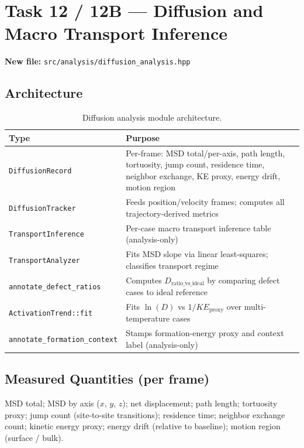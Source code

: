 \documentclass[11pt,a4paper]{article}
\begin{document}
\section{Task 12 / 12B --- Diffusion and Macro Transport Inference}

\textbf{New file:} \texttt{src/analysis/diffusion\_analysis.hpp}

\subsection{Architecture}

\begin{table}[h!]
\centering
\begin{tabularx}{\linewidth}{lX}
\toprule
\textbf{Type} & \textbf{Purpose} \\
\midrule
\texttt{DiffusionRecord}        & Per-frame: MSD total/per-axis, path length, tortuosity, jump count, residence time, neighbor exchange, KE proxy, energy drift, motion region \\
\texttt{DiffusionTracker}       & Feeds position/velocity frames; computes all trajectory-derived metrics \\
\texttt{TransportInference}     & Per-case macro transport inference table (analysis-only) \\
\texttt{TransportAnalyzer}      & Fits MSD slope via linear least-squares; classifies transport regime \\
\texttt{annotate\_defect\_ratios}   & Computes $D_\text{ratio\_vs\_ideal}$ by comparing defect cases to ideal reference \\
\texttt{ActivationTrend::fit}   & Fits $\ln(D)$ vs $1/KE_\text{proxy}$ over multi-temperature cases \\
\texttt{annotate\_formation\_context} & Stamps formation-energy proxy and context label (analysis-only) \\
\bottomrule
\end{tabularx}
\caption{Diffusion analysis module architecture.}
\end{table}

\subsection{Measured Quantities (per frame)}

MSD total; MSD by axis ($x$, $y$, $z$); net displacement; path length; tortuosity proxy; jump
count (site-to-site transitions); residence time; neighbor exchange count; kinetic energy proxy;
energy drift (relative to baseline); motion region (surface / bulk).
\end{document}
